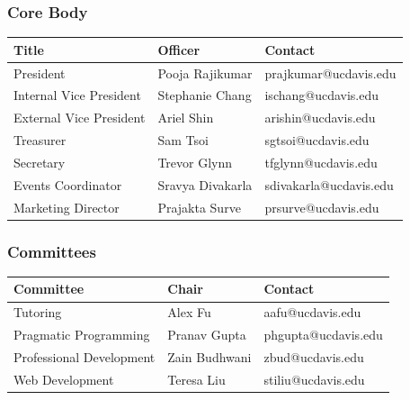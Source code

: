 \documentclass{article}
\begin{document}
\subsubsection{Core Body}
\begin{center}
\begin{tabular}{lll}
  \toprule
\textbf{Title} & \textbf{Officer} & \textbf{Contact} \\
  \midrule
President & Pooja Rajikumar & prajkumar@ucdavis.edu \\
Internal Vice President & Stephanie Chang & ischang@ucdavis.edu \\
External Vice President & Ariel Shin & arishin@ucdavis.edu \\
Treasurer & Sam Tsoi & sgtsoi@ucdavis.edu\\
Secretary & Trevor Glynn & tfglynn@ucdavis.edu \\
Events Coordinator & Sravya Divakarla  & sdivakarla@ucdavis.edu\\
Marketing Director & Prajakta Surve & prsurve@ucdavis.edu\\
  \bottomrule
\end{tabular}
\end{center}

\subsubsection{Committees}
\begin{center}
\begin{tabular}{lll}
  \toprule
\textbf{Committee} & \textbf{Chair} & \textbf{Contact} \\
  \midrule
Tutoring & Alex Fu & aafu@ucdavis.edu \\
Pragmatic Programming & Pranav Gupta & phgupta@ucdavis.edu \\
Professional Development & Zain Budhwani & zbud@ucdavis.edu\\
Web Development & Teresa Liu & stiliu@ucdavis.edu \\
  \bottomrule
\end{tabular}
\end{center}
\end{document}
